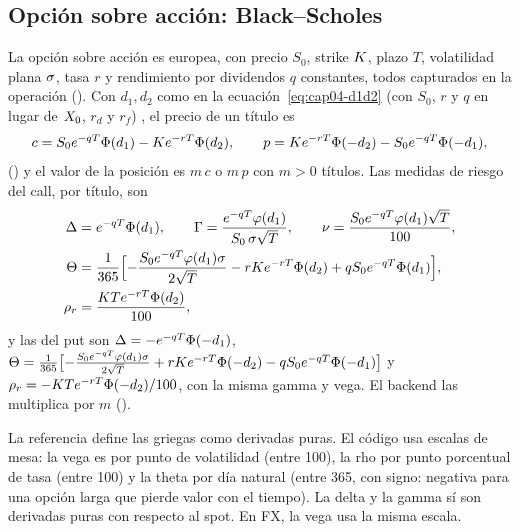 \subsection{Opción sobre acción: Black--Scholes}\label{sec:cap04-bs}

La opción sobre acción es europea, con precio $S_0$, strike $K$, plazo $T$, volatilidad plana $\sigma$, tasa
$r$ y rendimiento por dividendos $q$ constantes, todos capturados en la operación
(). Con $d_1,d_2$ como en la ecuación~\eqref{eq:cap04-d1d2}
(con $S_0$, $r$ y $q$ en lugar de $X_0$, $r_d$ y $r_f$) \citep{black1973,merton1973}, el precio de un título es
\begin{equation}\label{eq:cap04-bs}
  c = S_0 e^{-qT}\Phi(d_1) - K e^{-rT}\Phi(d_2),\qquad
  p = K e^{-rT}\Phi(-d_2) - S_0 e^{-qT}\Phi(-d_1),
\end{equation}
() y el valor de la posición es $m\,c$ o $m\,p$ con
$m>0$ títulos. Las medidas de riesgo del call, por título, son
\begin{equation}\label{eq:cap04-bs-griegas}
\begin{aligned}
  \Delta &= e^{-qT}\Phi(d_1), \qquad
  \Gamma = \frac{e^{-qT}\varphi(d_1)}{S_0\,\sigma\sqrt T}, \qquad
  \nu = \frac{S_0 e^{-qT}\varphi(d_1)\sqrt T}{100}, \\
  \Theta &= \frac{1}{365}\Bigl[-\frac{S_0 e^{-qT}\varphi(d_1)\sigma}{2\sqrt T} - rK e^{-rT}\Phi(d_2)
            + q S_0 e^{-qT}\Phi(d_1)\Bigr], \\
  \rho_r &= \frac{K T e^{-rT}\Phi(d_2)}{100},
\end{aligned}
\end{equation}
y las del put son $\Delta=-e^{-qT}\Phi(-d_1)$,
$\Theta=\frac{1}{365}\bigl[-\tfrac{S_0 e^{-qT}\varphi(d_1)\sigma}{2\sqrt T}+rK e^{-rT}\Phi(-d_2)-qS_0e^{-qT}\Phi(-d_1)\bigr]$
y $\rho_r=-K T e^{-rT}\Phi(-d_2)/100$, con la misma gamma y vega. El backend las multiplica por $m$
().

\begin{diferencia}
  La referencia \citep{hull2018} define las griegas como derivadas puras. El código usa escalas de mesa:
  la vega es por punto de volatilidad (entre 100), la rho por punto porcentual de tasa (entre 100) y la theta
  por día natural (entre 365, con signo: negativa para una opción larga que pierde valor con el tiempo). La
  delta y la gamma sí son derivadas puras con respecto al spot. En FX, la vega usa la misma escala.
\end{diferencia}

